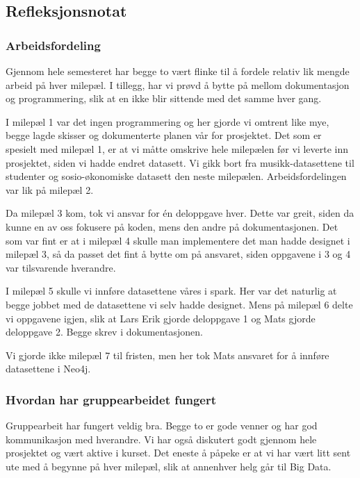 \subsection{Refleksjonsnotat}
\subsubsection{Arbeidsfordeling}
Gjennom hele semesteret har begge to vært flinke til å fordele relativ lik mengde arbeid på hver milepæl. I tillegg, har vi prøvd å bytte på mellom dokumentasjon og programmering, slik at en ikke blir sittende med det samme hver gang.

I milepæl 1 var det ingen programmering og her gjorde vi omtrent like mye, begge lagde skisser og dokumenterte planen vår for prosjektet. Det som er spesielt med milepæl 1, er at vi måtte omskrive hele milepælen før vi leverte inn prosjektet, siden vi hadde endret datasett. Vi gikk bort fra musikk-datasettene til studenter og sosio-økonomiske datasett den neste milepælen. Arbeidsfordelingen var lik på milepæl 2.

Da milepæl 3 kom, tok vi ansvar for én deloppgave hver. Dette var greit, siden da kunne en av oss fokusere på koden, mens den andre på dokumentasjonen. Det som var fint er at i milepæl 4 skulle man implementere det man hadde designet i milepæl 3, så da passet det fint å bytte om på ansvaret, siden oppgavene i 3 og 4 var tilsvarende hverandre.

I milepæl 5 skulle vi innføre datasettene våres i spark. Her var det naturlig at begge jobbet med de datasettene vi selv hadde designet. Mens på milepæl 6 delte vi oppgavene igjen, slik at Lars Erik gjorde deloppgave 1 og Mats gjorde deloppgave 2. Begge skrev i dokumentasjonen.

Vi gjorde ikke milepæl 7 til fristen, men her tok Mats ansvaret for å innføre datasettene i Neo4j.

\subsubsection{Hvordan har gruppearbeidet fungert}
Gruppearbeit har fungert veldig bra. Begge to er gode venner og har god kommunikasjon med hverandre. Vi har også diskutert godt gjennom hele prosjektet og vært aktive i kurset. Det eneste å påpeke er at vi har vært litt sent ute med å begynne på hver milepæl, slik at annenhver helg går til Big Data.